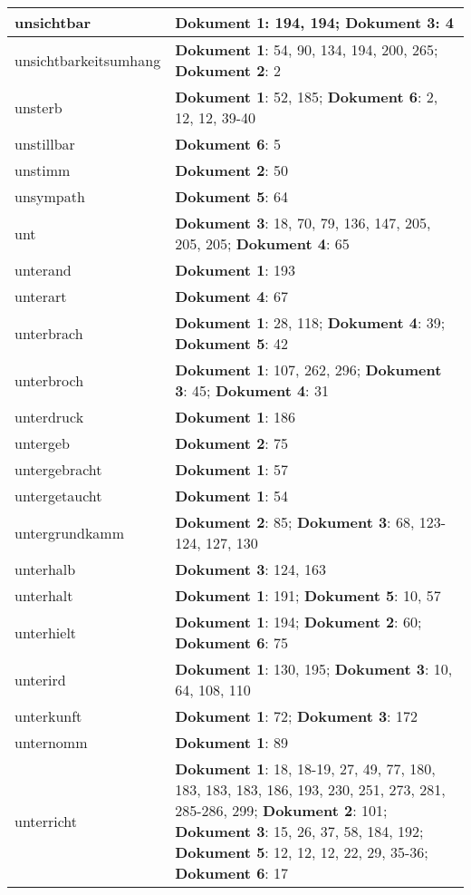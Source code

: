 \documentclass[a5paper]{article}
\begin{document}
\begin{longtable}[l]{|l|p{3in}|}
\hline
unsichtbar & \textbf{Dokument 1}: 194, 194; \textbf{Dokument 3}: 4 \\
\hline
unsichtbarkeitsumhang & \textbf{Dokument 1}: 54, 90, 134, 194, 200, 265; \textbf{Dokument 2}: 2 \\
\hline
unsterb & \textbf{Dokument 1}: 52, 185; \textbf{Dokument 6}: 2, 12, 12, 39-40 \\
\hline
unstillbar & \textbf{Dokument 6}: 5 \\
\hline
unstimm & \textbf{Dokument 2}: 50 \\
\hline
unsympath & \textbf{Dokument 5}: 64 \\
\hline
unt & \textbf{Dokument 3}: 18, 70, 79, 136, 147, 205, 205, 205; \textbf{Dokument 4}: 65 \\
\hline
unterand & \textbf{Dokument 1}: 193 \\
\hline
unterart & \textbf{Dokument 4}: 67 \\
\hline
unterbrach & \textbf{Dokument 1}: 28, 118; \textbf{Dokument 4}: 39; \textbf{Dokument 5}: 42 \\
\hline
unterbroch & \textbf{Dokument 1}: 107, 262, 296; \textbf{Dokument 3}: 45; \textbf{Dokument 4}: 31 \\
\hline
unterdruck & \textbf{Dokument 1}: 186 \\
\hline
untergeb & \textbf{Dokument 2}: 75 \\
\hline
untergebracht & \textbf{Dokument 1}: 57 \\
\hline
untergetaucht & \textbf{Dokument 1}: 54 \\
\hline
untergrundkamm & \textbf{Dokument 2}: 85; \textbf{Dokument 3}: 68, 123-124, 127, 130 \\
\hline
unterhalb & \textbf{Dokument 3}: 124, 163 \\
\hline
unterhalt & \textbf{Dokument 1}: 191; \textbf{Dokument 5}: 10, 57 \\
\hline
unterhielt & \textbf{Dokument 1}: 194; \textbf{Dokument 2}: 60; \textbf{Dokument 6}: 75 \\
\hline
unterird & \textbf{Dokument 1}: 130, 195; \textbf{Dokument 3}: 10, 64, 108, 110 \\
\hline
unterkunft & \textbf{Dokument 1}: 72; \textbf{Dokument 3}: 172 \\
\hline
unternomm & \textbf{Dokument 1}: 89 \\
\hline
unterricht & \textbf{Dokument 1}: 18, 18-19, 27, 49, 77, 180, 183, 183, 183, 186, 193, 230, 251, 273, 281, 285-286, 299; \textbf{Dokument 2}: 101; \textbf{Dokument 3}: 15, 26, 37, 58, 184, 192; \textbf{Dokument 5}: 12, 12, 12, 22, 29, 35-36; \textbf{Dokument 6}: 17 \\

\end{longtable}
\end{document}
